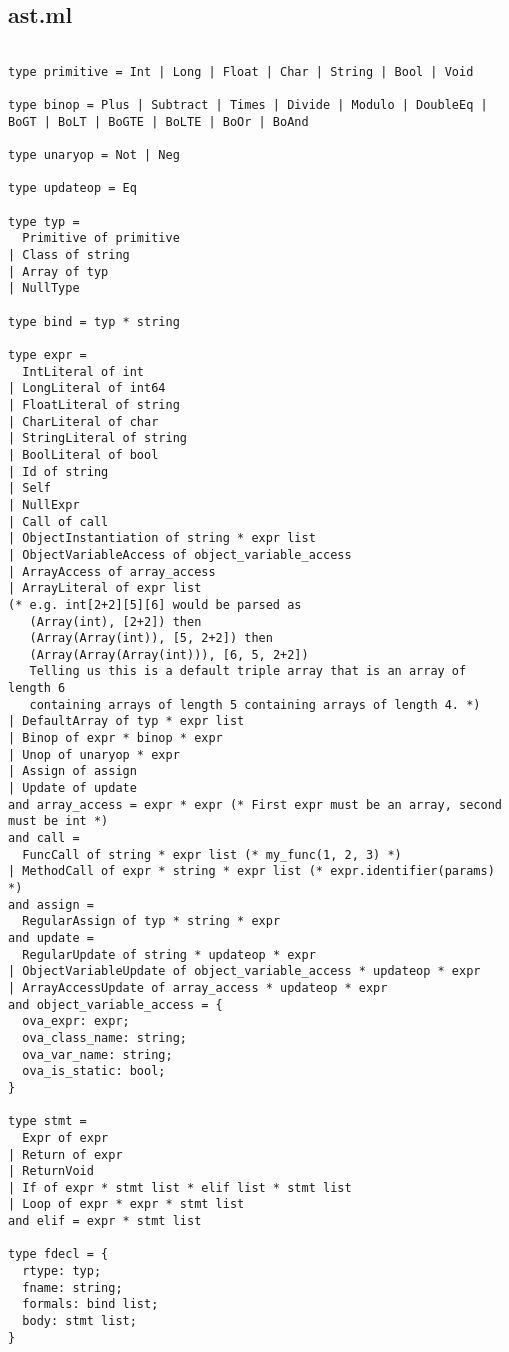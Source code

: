 \documentclass{article}
\begin{document}
\subsection{ast.ml}
\begin{verbatim}

type primitive = Int | Long | Float | Char | String | Bool | Void

type binop = Plus | Subtract | Times | Divide | Modulo | DoubleEq | BoGT | BoLT | BoGTE | BoLTE | BoOr | BoAnd

type unaryop = Not | Neg

type updateop = Eq

type typ = 
  Primitive of primitive
| Class of string
| Array of typ
| NullType

type bind = typ * string

type expr =
  IntLiteral of int
| LongLiteral of int64
| FloatLiteral of string
| CharLiteral of char
| StringLiteral of string
| BoolLiteral of bool
| Id of string
| Self
| NullExpr
| Call of call
| ObjectInstantiation of string * expr list
| ObjectVariableAccess of object_variable_access
| ArrayAccess of array_access
| ArrayLiteral of expr list
(* e.g. int[2+2][5][6] would be parsed as
   (Array(int), [2+2]) then
   (Array(Array(int)), [5, 2+2]) then
   (Array(Array(Array(int))), [6, 5, 2+2])
   Telling us this is a default triple array that is an array of length 6
   containing arrays of length 5 containing arrays of length 4. *)
| DefaultArray of typ * expr list
| Binop of expr * binop * expr
| Unop of unaryop * expr
| Assign of assign
| Update of update
and array_access = expr * expr (* First expr must be an array, second must be int *)
and call =
  FuncCall of string * expr list (* my_func(1, 2, 3) *)
| MethodCall of expr * string * expr list (* expr.identifier(params) *)
and assign =
  RegularAssign of typ * string * expr
and update =
  RegularUpdate of string * updateop * expr
| ObjectVariableUpdate of object_variable_access * updateop * expr
| ArrayAccessUpdate of array_access * updateop * expr
and object_variable_access = {
  ova_expr: expr;
  ova_class_name: string;
  ova_var_name: string;
  ova_is_static: bool;
}

type stmt =
  Expr of expr
| Return of expr
| ReturnVoid
| If of expr * stmt list * elif list * stmt list
| Loop of expr * expr * stmt list
and elif = expr * stmt list

type fdecl = {
  rtype: typ;
  fname: string;
  formals: bind list;
  body: stmt list;
}


\end{verbatim}
\end{document}
